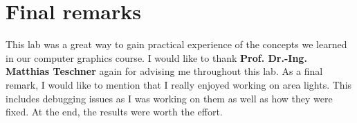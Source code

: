 \documentclass[11pt,a4paper]{article}
\begin{document}
	\section{Final remarks}
	This lab was a great way to gain practical experience of the concepts we learned in our computer graphics course. I would like to thank \textbf{Prof. Dr.-Ing. Matthias Teschner} again for advising me throughout this lab. As a final remark, I would like to mention that I really enjoyed working on area lights. This includes debugging issues as I was working on them as well as how they were fixed. At the end, the results were worth the effort.
	
	
	
	
\end{document}
